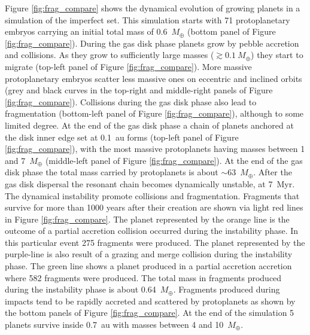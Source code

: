 \documentclass[fleqn,usenatbib]{mnras}
\begin{document}
Figure \ref{fig:frag_compare} shows the dynamical evolution of growing planets in a simulation of the imperfect set. This simulation starts with 71 protoplanetary embryos carrying an initial total mass of 0.6~$M_{\oplus}$ (bottom panel of Figure \ref{fig:frag_compare}). During the gas disk phase planets grow by pebble accretion and collisions. As they grow to sufficiently large masses ($ \gtrsim 0.1~M_{\oplus}$) they start to migrate (top-left panel of Figure \ref{fig:frag_compare}). More massive protoplanetary embryos scatter less massive ones on eccentric and inclined orbits (grey and black curves in the top-right and middle-right panels of Figure \ref{fig:frag_compare}). Collisions during the gas disk phase also lead to fragmentation (bottom-left panel of Figure \ref{fig:frag_compare}), although to some limited degree. At the end of the gas disk phase a chain of planets anchored at the disk inner edge set at 0.1~au forms (top-left panel of Figure \ref{fig:frag_compare}), with the most massive protoplanets having masses between 1 and 7~$M_{\oplus}$ (middle-left panel of Figure \ref{fig:frag_compare}). At the end of the gas disk phase the total mass carried by protoplanets is about $\sim$63~$M_{\oplus}$. After the gas disk dispersal the resonant chain becomes dynamically unstable, at 7~Myr. The dynamical instability promote collisions and fragmentation. Fragments that survive for more than 1000 years after their creation are shown via light red lines in Figure \ref{fig:frag_compare}. The planet represented by the orange line is the outcome of a partial accretion collision occurred during the instability phase. In this particular event 275 fragments were produced. The planet represented by the purple-line is also result of a grazing and merge collision during the instability phase. The green line shows a planet produced in a partial accretion accretion where 582 fragments were produced. The total mass in fragments produced during the instability phase is about 0.64~$M_{\oplus}$. Fragments produced during impacts tend to be rapidly accreted and scattered by protoplanets as shown by the bottom panels of Figure \ref{fig:frag_compare}. At the end of the simulation 5 planets survive inside 0.7~au with masses between 4 and 10~$M_{\oplus}$. 

\end{document}
